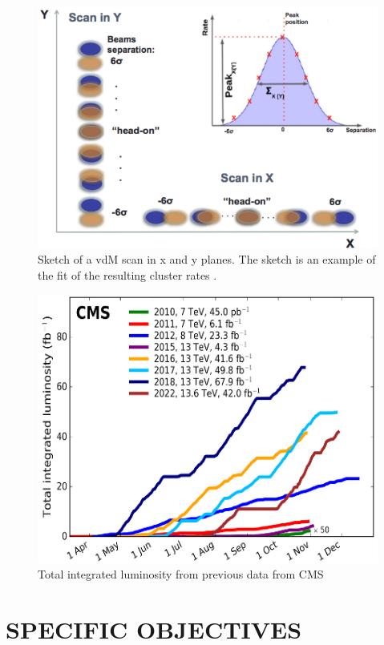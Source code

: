 \documentclass[final,12p]{article}
\begin{document}
\begin{figure}[H]
  \centering
  \includegraphics[width=0.7\columnwidth]{./vdm_sketch.png}
  \caption{
   Sketch of a vdM scan in x and y planes. The sketch is an example of
the fit of the resulting cluster rates \cite{vdMSketch}.
  }
  \label{vdMSketch}
\end{figure}

\begin{figure}[H]
  \centering
  \includegraphics[width=0.7\columnwidth]{./integratedlum.png}
  \caption{
   Total integrated luminosity from previous data from CMS
  }
  \label{Integrated luminosity}
\end{figure}



\section{SPECIFIC OBJECTIVES}
\end{document}
